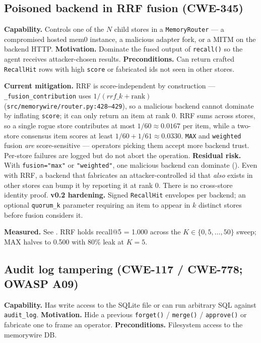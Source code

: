 \documentclass[11pt,letterpaper,twocolumn]{article}
\begin{document}
\subsection{Poisoned backend in RRF fusion (CWE-345)}
\label{sec:threats-poisoned}

\textbf{Capability.} Controls one of the $N$ child stores in a \texttt{MemoryRouter} --- a compromised hosted mem0 instance, a malicious adapter fork, or a MITM on the backend HTTP. \textbf{Motivation.} Dominate the fused output of \texttt{recall()} so the agent receives attacker-chosen results. \textbf{Preconditions.} Can return crafted \texttt{RecallHit} rows with high \texttt{score} or fabricated ids not seen in other stores.

\textbf{Current mitigation.} RRF is score-independent by construction --- \texttt{\_fusion\_contribution} uses $1 / (\mathit{rrf\_k} + \mathrm{rank})$ (\texttt{src/memorywire/router.py:428--429}), so a malicious backend cannot dominate by inflating \texttt{score}; it can only return an item at rank 0. RRF sums across stores, so a single rogue store contributes at most $1/60 \approx 0.0167$ per item, while a two-store consensus item scores at least $1/60 + 1/61 \approx 0.0330$. \texttt{MAX} and \texttt{weighted} fusion \emph{are} score-sensitive --- operators picking them accept more backend trust. Per-store failures are logged but do not abort the operation. \textbf{Residual risk.} With \texttt{fusion="max"} or \texttt{"weighted"}, one malicious backend can dominate (). Even with RRF, a backend that fabricates an attacker-controlled id that \emph{also} exists in other stores can bump it by reporting it at rank 0. There is no cross-store identity proof. \textbf{v0.2 hardening.} Signed \texttt{RecallHit} envelopes per backend; an optional \texttt{quorum\_k} parameter requiring an item to appear in $k$ distinct stores before fusion considers it.

\textbf{Measured.} See . RRF holds recall@5 = 1.000 across the $K \in \{0,5,\dots,50\}$ sweep; MAX halves to 0.500 with 80\% leak at $K=5$.

\subsection{Audit log tampering (CWE-117 / CWE-778; OWASP A09)}
\label{sec:threats-audit}

\textbf{Capability.} Has write access to the SQLite file or can run arbitrary SQL against \texttt{audit\_log}. \textbf{Motivation.} Hide a previous \texttt{forget()} / \texttt{merge()} / \texttt{approve()} or fabricate one to frame an operator. \textbf{Preconditions.} Filesystem access to the memorywire DB.
\end{document}
